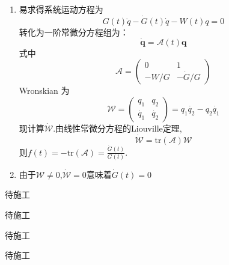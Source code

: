 \begin{solution}
    \begin{enumerate}[label=(\arabic*)]
        \item 易求得系统运动方程为
        \[
            G(t)\ddot{q}-\dot{G}(t)\dot{q}-W(t){q}=0
        \]
        转化为一阶常微分方程组为：
        \[
            \dot{\mathbf{q}}=\mathcal{A}(t)\mathbf{q}
        \]
        式中
        \[
            \mathcal{A}=\begin{pmatrix}
                0&1\\
                -W/G&-\dot{G}/G
            \end{pmatrix}
        \]
        Wronskian 为
        \[
            \mathcal{W}=\begin{pmatrix}
                q_1&q_2\\
                \dot{q_1}&\dot{q_2}
            \end{pmatrix}
            =q_1\dot{q_2}-q_2\dot{q_1}
        \]
        现计算$\dot{\mathcal{W}}$.由线性常微分方程的Liouville定理,
        \[
            \dot{\mathcal{W}}=\mathrm{tr}(\mathcal{A})\mathcal{W}
        \]
        则$f(t)=-\mathrm{tr}(\mathcal{A})=\frac{\dot{G}(t)}{G(t)}$.
        \item 由于$\mathcal{W}\neq 0$,$\dot{\mathcal{W}}=0$意味着$\dot{G}(t)=0$
    \end{enumerate}
\end{solution}

\begin{solution}
    待施工
\end{solution}

\begin{solution}
    待施工
\end{solution}

\begin{solution}
    待施工
\end{solution}

\begin{solution}
    待施工
\end{solution}